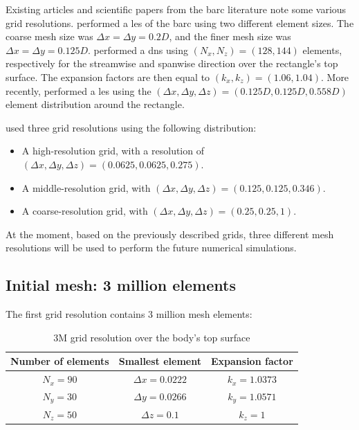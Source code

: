 \documentclass[12pt,twoside]{report}
\begin{document}
Existing articles and scientific papers from the \gls{barc} literature note some various grid resolutions. 
\cite{mariotti_stochastic_2017} performed a \gls{les} of the \gls{barc} using two different element sizes. The coarse mesh size was $\Delta x = \Delta y = 0.2D$, and the finer mesh size was $\Delta x = \Delta y = 0.125D$. \cite{cimarelli_direct_2018} performed a \gls{dns} using $\left(N_x, N_z \right) = (128,144)$ elements, respectively for the streamwise and spanwise direction over the rectangle's top surface. The expansion factors are then equal to $\left( k_x, k_z \right)=(1.06, 1.04)$.  More recently, \cite{rocchio_flow_2020} performed a \gls{les} using the $\left( \Delta x, \Delta y, \Delta z \right) = \left( 0.125D, 0.125D, 0.558D \right)$ element distribution around the rectangle.

\clearpage

\cite{moldovan_multigridensemble_2021} used three grid resolutions using the following distribution:
\begin{itemize}[noitemsep]
	\item[$-$] A high-resolution grid, with a resolution of $\left( \Delta x, \Delta y, \Delta z \right)=(0.0625, 0.0625, 0.275)$.
	\item[$-$] A middle-resolution grid, with $\left( \Delta x, \Delta y, \Delta z \right)=(0.125, 0.125, 0.346)$.
	\item[$-$] A coarse-resolution grid, with $\left( \Delta x, \Delta y, \Delta z \right)=(0.25, 0.25, 1)$.
\end{itemize}

At the moment, based on the previously described grids, three different mesh resolutions will be used to perform the future numerical simulations.

\subsection{Initial mesh: 3 million elements}

The first grid resolution contains 3 million mesh elements: 
\begin{table}[h!]
\centering
\begin{tabular}{ccc} \toprule[1.5pt]
\textbf{Number of elements} & \textbf{Smallest element} & \textbf{Expansion factor} \\ \midrule[0.25pt]
$N_x=90$ & $\Delta x = 0.0222$ & $k_x=1.0373$ \\
$N_y=30$ & $\Delta y=0.0266$ & $k_y=1.0571$ \\
$N_z=50$ & $\Delta z=0.1$ & $k_z=1$ \\ \bottomrule[1.5pt]
\end{tabular}
\caption{3M grid resolution over the body's top surface}
\label{tab:3M Grid resolution over body's top surface}
\end{table}
\end{document}

